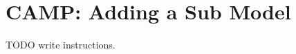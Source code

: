 \chapter{CAMP\+: Adding a Sub Model}
\hypertarget{camp_sub_model_add}{}\label{camp_sub_model_add}
TODO write instructions.